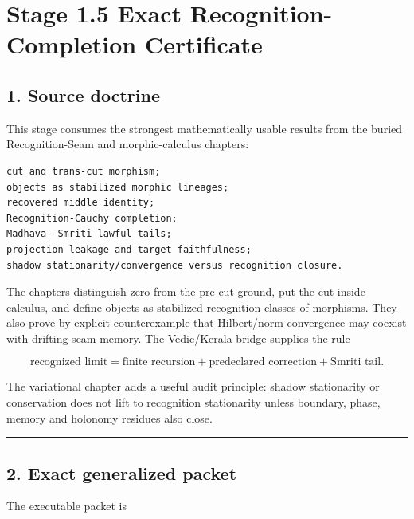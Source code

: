 \hypertarget{stage-1.5-exact-recognition-completion-certificate}{%
\chapter{Stage 1.5 Exact Recognition-Completion Certificate}\label{stage-1.5-exact-recognition-completion-certificate}}

\hypertarget{source-doctrine}{%
\section{1. Source doctrine}\label{source-doctrine}}

This stage consumes the strongest mathematically usable results from the buried Recognition-Seam and morphic-calculus chapters:

\begin{verbatim}
cut and trans-cut morphism;
objects as stabilized morphic lineages;
recovered middle identity;
Recognition-Cauchy completion;
Madhava--Smriti lawful tails;
projection leakage and target faithfulness;
shadow stationarity/convergence versus recognition closure.
\end{verbatim}

The chapters distinguish zero from the pre-cut ground, put the cut inside calculus, and define objects as stabilized recognition classes of morphisms. They also prove by explicit counterexample that Hilbert/norm convergence may coexist with drifting seam memory. The Vedic/Kerala bridge supplies the rule

\[
\text{recognized limit}
=
\text{finite recursion}
+
\text{predeclared correction}
+
\text{Smriti tail}.
\]

The variational chapter adds a useful audit principle: shadow stationarity or conservation does not lift to recognition stationarity unless boundary, phase, memory and holonomy residues also close.

\begin{center}\rule{0.5\linewidth}{0.5pt}\end{center}

\hypertarget{exact-generalized-packet}{%
\section{2. Exact generalized packet}\label{exact-generalized-packet}}

The executable packet is

